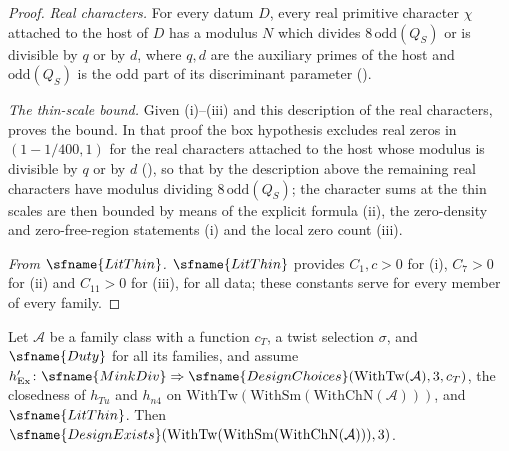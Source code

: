 \begin{proof}
\emph{Real characters.} For every datum $D$, every real primitive character $\chi$ attached to the host of $D$ has a
modulus $N$ which divides $8\,\mathrm{odd}(Q_S)$ or is divisible by $q$ or by $d$, where $q,d$ are the auxiliary primes
of the host and $\mathrm{odd}(Q_S)$ is the odd part of its discriminant parameter
().

\emph{The thin-scale bound.} Given (i)--(iii) and this description of the real characters,
 proves the bound. In that
proof the box hypothesis excludes real zeros in $(1-1/400,1)$ for the real characters attached to the host whose
modulus is divisible by $q$ or by $d$ (), so that by
the description above the remaining real characters have modulus dividing $8\,\mathrm{odd}(Q_S)$; the character sums
at the thin scales are then bounded by means of the explicit formula (ii), the zero-density and zero-free-region
statements (i) and the local zero count (iii).

\emph{From $\sfname{LitThin}$.} $\sfname{LitThin}$ provides $C_1,c>0$ for (i), $C_7>0$ for (ii) and $C_{11}>0$ for
(iii), for all data; these constants serve for every member of every family.
\end{proof}

\begin{proposition}\label{pf:top-shape:designthm}
Let $\mathcal A$ be a family class with a function $c_T$, a twist selection $\sigma$, and $\sfname{Duty}$ for all its
families, and assume $h'_{\rm Ex}\colon\sfname{MinkDiv}\Rightarrow\sfname{DesignChoices}(\mathrm{WithTw}(\mathcal
A),3,c_T)$, the closedness of $h_{Tu}$ and $h_{n4}$ on $\mathrm{WithTw}(\mathrm{WithSm}(\mathrm{WithChN}(\mathcal A)))$, and
$\sfname{LitThin}$. Then $\sfname{DesignExists}(\mathrm{WithTw}(\mathrm{WithSm}(\mathrm{WithChN}(\mathcal A))),3)$.
\end{proposition}

